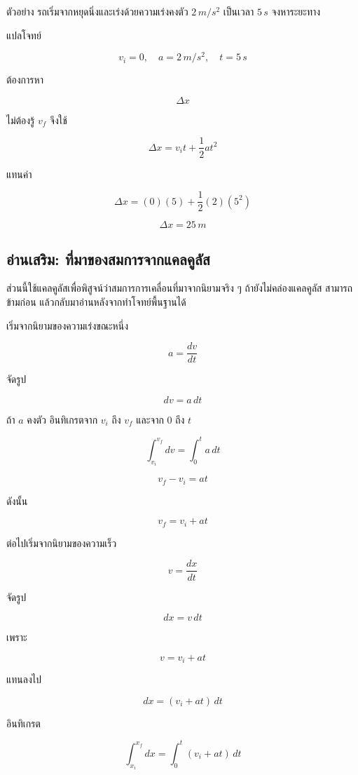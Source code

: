 \begin{examplebox}{ตัวอย่าง}
รถเริ่มจากหยุดนิ่งและเร่งด้วยความเร่งคงตัว $2\,\si{m/s^2}$ เป็นเวลา $5\,\si{s}$ จงหาระยะทาง

แปลโจทย์

\[
v_i=0,\quad a=2\,\si{m/s^2},\quad t=5\,\si{s}
\]

ต้องการหา

\[
\Delta x
\]

ไม่ต้องรู้ $v_f$ จึงใช้

\[
\Delta x=v_it+\frac{1}{2}at^2
\]

แทนค่า

\[
\Delta x=(0)(5)+\frac{1}{2}(2)(5^2)
\]

\[
\Delta x=25\,\si{m}
\]
\end{examplebox}

\subsection{อ่านเสริม: ที่มาของสมการจากแคลคูลัส}

\begin{tcolorbox}[title=หมายเหตุสำหรับผู้เรียน]
ส่วนนี้ใช้แคลคูลัสเพื่อพิสูจน์ว่าสมการการเคลื่อนที่มาจากนิยามจริง ๆ ถ้ายังไม่คล่องแคลคูลัส สามารถข้ามก่อน แล้วกลับมาอ่านหลังจากทำโจทย์พื้นฐานได้
\end{tcolorbox}

เริ่มจากนิยามของความเร่งขณะหนึ่ง

\[
a=\frac{dv}{dt}
\]

จัดรูป

\[
dv=a\,dt
\]

ถ้า $a$ คงตัว อินทิเกรตจาก $v_i$ ถึง $v_f$ และจาก $0$ ถึง $t$

\[
\int_{v_i}^{v_f}dv=\int_0^t a\,dt
\]

\[
v_f-v_i=at
\]

ดังนั้น

\[
v_f=v_i+at
\]

ต่อไปเริ่มจากนิยามของความเร็ว

\[
v=\frac{dx}{dt}
\]

จัดรูป

\[
dx=v\,dt
\]

เพราะ

\[
v=v_i+at
\]

แทนลงไป

\[
dx=(v_i+at)\,dt
\]

อินทิเกรต

\[
\int_{x_i}^{x_f}dx=\int_0^t (v_i+at)\,dt
\]

